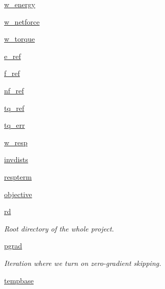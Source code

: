 \begin{DoxyCompactItemize}
\item 
\hyperlink{classforcebalance_1_1abinitio_1_1AbInitio_aa7f09e2ffc1253844c9f0736caf9b9e5}{w\-\_\-energy}
\item 
\hyperlink{classforcebalance_1_1abinitio_1_1AbInitio_af7cbfd50ca6a0b408c417e8d3bdb7cf3}{w\-\_\-netforce}
\item 
\hyperlink{classforcebalance_1_1abinitio_1_1AbInitio_a67643b98cce62c06c95f085d3a3e9722}{w\-\_\-torque}
\item 
\hyperlink{classforcebalance_1_1abinitio_1_1AbInitio_a71d13d3fabd98146c68bb5fc784f6732}{e\-\_\-ref}
\item 
\hyperlink{classforcebalance_1_1abinitio_1_1AbInitio_a6631ee11ee5646d97ea0fa5c9b22fc6a}{f\-\_\-ref}
\item 
\hyperlink{classforcebalance_1_1abinitio_1_1AbInitio_a5a77f4b99a5b01245ab0435d632122a1}{nf\-\_\-ref}
\item 
\hyperlink{classforcebalance_1_1abinitio_1_1AbInitio_aadda7244869b583a4533317615c421e1}{tq\-\_\-ref}
\item 
\hyperlink{classforcebalance_1_1abinitio_1_1AbInitio_ae60e834d5b5bf13f8fb70d403a97db28}{tq\-\_\-err}
\item 
\hyperlink{classforcebalance_1_1abinitio_1_1AbInitio_a176a442bd340d2f9b54319e76feb46ae}{w\-\_\-resp}
\item 
\hyperlink{classforcebalance_1_1abinitio_1_1AbInitio_aa01ee600ba0f429ffc81135af9d8109b}{invdists}
\item 
\hyperlink{classforcebalance_1_1abinitio_1_1AbInitio_a689e3849518b33539442a473a41ed32d}{respterm}
\item 
\hyperlink{classforcebalance_1_1abinitio_1_1AbInitio_acbbd447b9f66bc4699992f3b64bb256d}{objective}
\item 
\hyperlink{classforcebalance_1_1target_1_1Target_a4edb69fbde792e9f2f27e54b7c978c8e}{rd}
\begin{DoxyCompactList}\small\item\em Root directory of the whole project. \end{DoxyCompactList}\item 
\hyperlink{classforcebalance_1_1target_1_1Target_a684235b4332b608c4e2da22982c2fdfa}{pgrad}
\begin{DoxyCompactList}\small\item\em Iteration where we turn on zero-\/gradient skipping. \end{DoxyCompactList}\item 
\hyperlink{classforcebalance_1_1target_1_1Target_ae5b544d3e11365865813ef3d626ef81d}{tempbase}

\end{DoxyCompactItemize}
